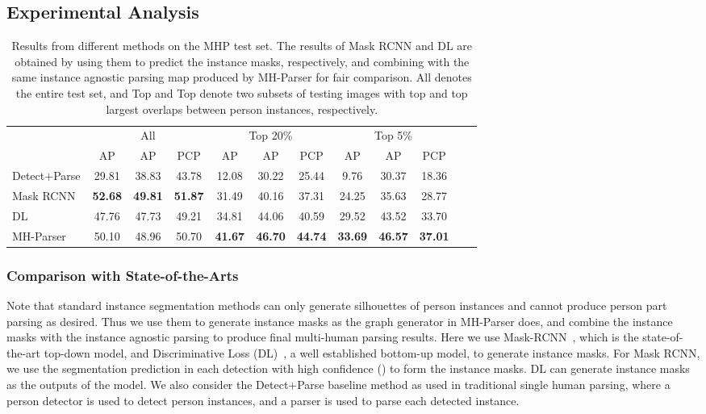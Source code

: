 \documentclass[10pt, letterpaper]{article}
\begin{document}
\subsection{Experimental Analysis}

\begin{table}
  \centering
	\scriptsize
  \caption{Results from different methods on the MHP test set. The results of Mask RCNN and DL are obtained by using them to predict the instance masks, respectively, and combining with the same instance agnostic parsing map produced by MH-Parser for fair comparison. All denotes the entire test set, and Top  and Top  denote two subsets of testing images with top  and top  largest overlaps between person instances, respectively.} \label{tab:mhp_test}
  \vspace{4mm}
  \begin{tabular}{lccccccccccc}
    \toprule
\multirow{2}{*}{} & \multicolumn{3}{c}{All}	& \multicolumn{3}{c}{Top 20\%} &  \multicolumn{3}{c}{Top 5\% } \\ 
\cmidrule[\heavyrulewidth](lr){2-4}  \cmidrule[\heavyrulewidth](lr){5-7}\cmidrule[\heavyrulewidth](lr){8-10} 
& AP  & AP & PCP &  AP  & AP & PCP &  AP  & AP & PCP \\
    \midrule
Detect+Parse  &29.81 & 38.83 & 43.78 & 12.08 & 30.22 &25.44 & 9.76 & 30.37 &18.36 \\
Mask RCNN~\cite{he2017mask} & \textbf{52.68} & \textbf{49.81} & \textbf{51.87} & 31.49 & 40.16 & 37.31 & 24.25 &35.63 & 28.77 \\
DL~\cite{de2017semantic} & 47.76 & 47.73 & 49.21  & 34.81 & 44.06 & 40.59 & 29.52 & 43.52 & 33.70 \\
MH-Parser &  50.10 &48.96 & 50.70  & \textbf{41.67} & \textbf{46.70} & \textbf{44.74} & \textbf{33.69} & \textbf{46.57 }& \textbf{37.01} \\
\bottomrule
  \end{tabular}
\end{table}


\subsubsection{Comparison with State-of-the-Arts}
Note that standard instance segmentation methods can only generate silhouettes of person instances and cannot produce person part parsing as desired. Thus we use them to generate instance masks as the graph generator in MH-Parser does, and combine the instance masks with the instance agnostic parsing to produce final multi-human parsing results. Here we use Mask-RCNN~\cite{he2017mask}, which is the state-of-the-art top-down model, and Discriminative Loss (DL)~\cite{de2017semantic}, a well established bottom-up model,  to generate instance masks. For Mask RCNN, we use the segmentation prediction in each detection with high confidence () to form the instance masks. DL can generate instance masks as the outputs of the model.  We also consider the Detect+Parse baseline method as used in traditional single human parsing, where a person detector is used to detect person instances, and a parser is used to parse each detected instance.
\end{document}
